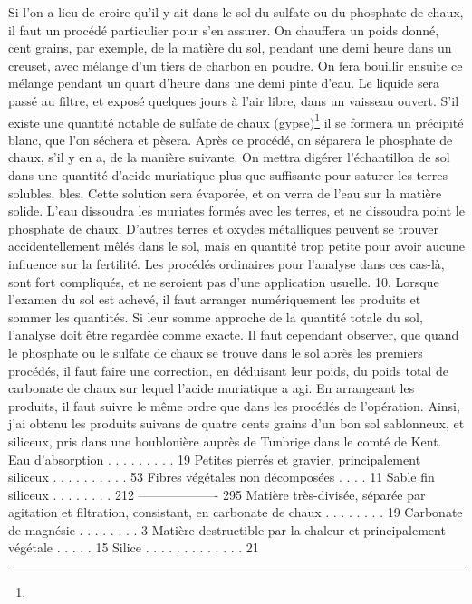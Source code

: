 Si l'on a lieu de croire qu'il y ait dans le sol du sulfate ou du phosphate de chaux, il faut un procédé particulier pour s'en assurer. On chauffera un poids donné, cent grains, par exemple, de la matière du sol, pendant une demi heure dans un creuset, avec mélange d'un tiers de charbon en poudre. On fera bouillir ensuite ce mélange pendant un quart d'heure dans une demi pinte d'eau. Le liquide sera passé au filtre, et exposé quelques jours à l'air libre, dans un vaisseau ouvert. S'il existe une quantité notable de sulfate de chaux (gypse)\footnote{} il se formera un précipité blanc, que l'on séchera et pèsera.
Après ce procédé, on séparera le phosphate de chaux, s'il y en a, de la manière suivante. On mettra digérer l'échantillon de sol dans une quantité d'acide muriatique plus que suffisante pour saturer les terres solubles.\setcounter{page}{435} bles. Cette solution sera évaporée, et on verra de l'eau sur la matière solide. L'eau dissoudra les muriates formés avec les terres, et ne dissoudra point le phosphate de chaux. D'autres terres et oxydes métalliques peuvent se trouver accidentellement mêlés dans le sol, mais en quantité trop petite pour avoir aucune influence sur la fertilité. Les procédés ordinaires pour l'analyse dans ces cas-là, sont fort compliqués, et ne seroient pas d'une application usuelle.
10. Lorsque l'examen du sol est achevé, il faut arranger numériquement les produits et sommer les quantités. Si leur somme approche de la quantité totale du sol, l'analyse doit être regardée comme exacte. Il faut cependant observer, que quand le phosphate ou le sulfate de chaux se trouve dans le sol après les premiers procédés, il faut faire une correction, en déduisant leur poids, du poids total de carbonate de chaux sur lequel l'acide muriatique a agi. En arrangeant les produits, il faut suivre le même ordre que dans les procédés de l'opération. Ainsi, j'ai obtenu les produits suivans de quatre cents grains d'un bon sol sablonneux, et siliceux, pris dans une houblonière auprès de Tunbrige dans le comté de Kent.\setcounter{page}{436} 
Eau d'absorption . . . . . . . . . 19
Petites pierrés et gravier, principalement siliceux . . . . . . . . . . 53
Fibres végétales non décomposées . . . . 11
Sable fin siliceux . . . . . . . . 212
-------------------                              295
Matière très-divisée, séparée par agitation et filtration, consistant, en carbonate de chaux . . . . . . . . 19
Carbonate de magnésie . . . . . . . . 3
Matière destructible par la chaleur et principalement végétale . . . . . 15
Silice . . . . . . . . . . . . . 21
